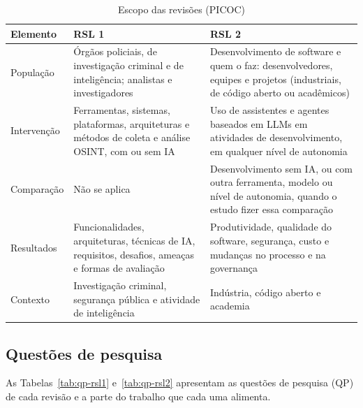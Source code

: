 \begin{table}[htbp]
	\centering
	\caption{Escopo das revisões (PICOC)}
	\label{tab:picoc}
	\small
	\begin{tabular}{p{2.1cm}>{\raggedright\arraybackslash}p{6.1cm}>{\raggedright\arraybackslash}p{6.1cm}}
		\hline
		\textbf{Elemento} & \textbf{RSL 1} & \textbf{RSL 2} \\
		\hline
		População & Órgãos policiais, de investigação criminal e de
		inteligência; analistas e investigadores &
		Desenvolvimento de software e quem o faz: desenvolvedores, equipes e
		projetos (industriais, de código aberto ou acadêmicos) \\
		\hline
		Intervenção & Ferramentas, sistemas, plataformas, arquiteturas e
		métodos de coleta e análise OSINT, com ou sem IA &
		Uso de assistentes e agentes baseados em LLMs em atividades de
		desenvolvimento, em qualquer nível de autonomia \\
		\hline
		Comparação & Não se aplica &
		Desenvolvimento sem IA, ou com outra ferramenta, modelo ou nível de
		autonomia, quando o estudo fizer essa comparação \\
		\hline
		Resultados & Funcionalidades, arquiteturas, técnicas de IA,
		requisitos, desafios, ameaças e formas de avaliação &
		Produtividade, qualidade do software, segurança, custo e mudanças no
		processo e na governança \\
		\hline
		Contexto & Investigação criminal, segurança pública e atividade de
		inteligência &
		Indústria, código aberto e academia \\
		\hline
	\end{tabular}
\end{table}

\subsection{Questões de pesquisa}

As Tabelas~\ref{tab:qp-rsl1} e~\ref{tab:qp-rsl2} apresentam as questões de
pesquisa (QP) de cada revisão e a parte do trabalho que cada uma alimenta.

